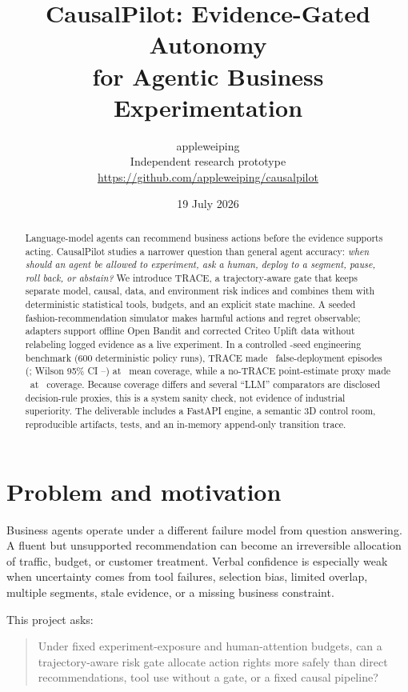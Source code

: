 \documentclass[11pt,twocolumn]{article}
\title{\vspace{-1.3em}\textbf{CausalPilot: Evidence-Gated Autonomy\\for Agentic Business Experimentation}}
\author{appleweiping \\ \small Independent research prototype \\ \small \url{https://github.com/appleweiping/causalpilot}}
\date{19 July 2026}
\begin{document}
\maketitle
\vspace{-1.1em}

\begin{abstract}
Language-model agents can recommend business actions before the evidence supports acting. CausalPilot studies a narrower question than general agent accuracy: \emph{when should an agent be allowed to experiment, ask a human, deploy to a segment, pause, roll back, or abstain?} We introduce TRACE, a trajectory-aware gate that keeps separate model, causal, data, and environment risk indices and combines them with deterministic statistical tools, budgets, and an explicit state machine. A seeded fashion-recommendation simulator makes harmful actions and regret observable; adapters support offline Open Bandit and corrected Criteo Uplift data without relabeling logged evidence as a live experiment. In a controlled \TraceRuns-seed engineering benchmark (600 deterministic policy runs), TRACE made \TraceFalseDeployCount\ false-deployment episodes (\TraceFalseDeploy; Wilson 95\% CI \TraceFalseDeployLow--\TraceFalseDeployHigh) at \TraceCoverage\ mean coverage, while a no-TRACE point-estimate proxy made \NoTraceFalseDeploy\ at \NoTraceCoverage\ coverage. Because coverage differs and several ``LLM'' comparators are disclosed decision-rule proxies, this is a system sanity check, not evidence of industrial superiority. The deliverable includes a FastAPI engine, a semantic 3D control room, reproducible artifacts, tests, and an in-memory append-only transition trace.
\end{abstract}

\section{Problem and motivation}

Business agents operate under a different failure model from question answering. A fluent but unsupported recommendation can become an irreversible allocation of traffic, budget, or customer treatment. Verbal confidence is especially weak when uncertainty comes from tool failures, selection bias, limited overlap, multiple segments, stale evidence, or a missing business constraint.

This project asks:

\begin{quote}\small
Under fixed experiment-exposure and human-attention budgets, can a trajectory-aware risk gate allocate action rights more safely than direct recommendations, tool use without a gate, or a fixed causal pipeline?
\end{quote}
\end{document}
